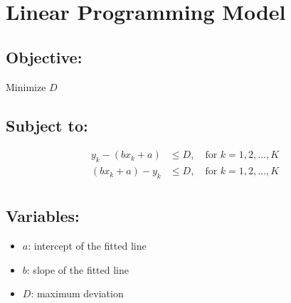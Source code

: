 \documentclass{article}
\begin{document}
\section*{Linear Programming Model}

\subsection*{Objective:}

Minimize \( D \)

\subsection*{Subject to:}

\begin{align*}
y_k - (bx_k + a) & \leq D, \quad \text{for } k = 1, 2, \ldots, K \\
(bx_k + a) - y_k & \leq D, \quad \text{for } k = 1, 2, \ldots, K \\
\end{align*}

\subsection*{Variables:}
\begin{itemize}
    \item \( a \): intercept of the fitted line
    \item \( b \): slope of the fitted line
    \item \( D \): maximum deviation
\end{itemize}
\end{document}
